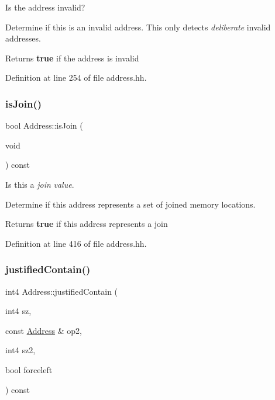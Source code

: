 Is the address invalid? 

Determine if this is an invalid address. This only detects {\itshape deliberate} invalid addresses. \begin{DoxyReturn}{Returns}
{\bfseries{true}} if the address is invalid 
\end{DoxyReturn}


Definition at line 254 of file address.\+hh.

\mbox{\label{class_address_ae0e5cdee35b24c75adcbfc444e6e5be6}} 
\subsubsection{\texorpdfstring{isJoin()}{isJoin()}}
{\footnotesize\ttfamily bool Address\+::is\+Join (\begin{DoxyParamCaption}\item[{void}]{ }\end{DoxyParamCaption}) const\hspace{0.3cm}{\ttfamily [inline]}}



Is this a {\itshape join} {\itshape value}. 

Determine if this address represents a set of joined memory locations. \begin{DoxyReturn}{Returns}
{\bfseries{true}} if this address represents a join 
\end{DoxyReturn}


Definition at line 416 of file address.\+hh.

\mbox{\label{class_address_a71d6969466b6edf50b9542e6a75dc439}} 
\subsubsection{\texorpdfstring{justifiedContain()}{justifiedContain()}}
{\footnotesize\ttfamily int4 Address\+::justified\+Contain (\begin{DoxyParamCaption}\item[{int4}]{sz,  }\item[{const \mbox{\hyperlink{class_address}{Address}} \&}]{op2,  }\item[{int4}]{sz2,  }\item[{bool}]{forceleft }\end{DoxyParamCaption}) const}



